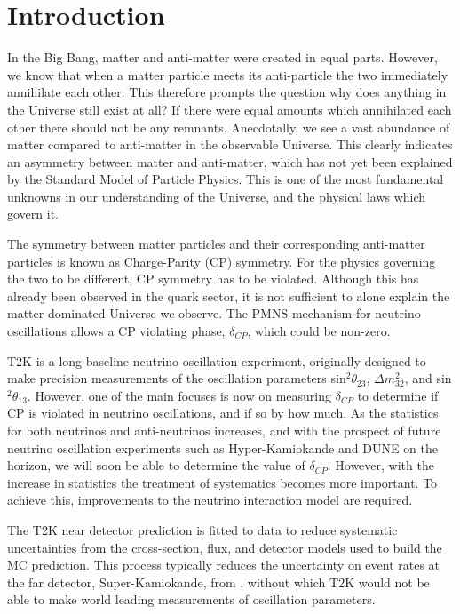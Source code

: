 \chapter{Introduction} \label{sec:introductions}

In the Big Bang, matter and anti-matter were created in equal parts. However, we know that when a matter particle meets its anti-particle the two immediately annihilate each other. This therefore prompts the question why does anything in the Universe still exist at all? If there were equal amounts which annihilated each other there should not be any remnants. Anecdotally, we see a vast abundance of matter compared to anti-matter in the observable Universe. This clearly indicates an asymmetry between matter and anti-matter, which has not yet been explained by the Standard Model of Particle Physics. This is one of the most fundamental unknowns in our understanding of the Universe, and the physical laws which govern it.

The symmetry between matter particles and their corresponding anti-matter particles is known as Charge-Parity (CP) symmetry. For the physics governing the two to be different, CP symmetry has to be violated. Although this has already been observed in the quark sector, it is not sufficient to alone explain the matter dominated Universe we observe. The PMNS mechanism for neutrino oscillations allows a CP violating phase, $\delta_{CP}$, which could be non-zero.

T2K \cite{PhysRevLett.121.171802} is a long baseline neutrino oscillation experiment, originally designed to make precision measurements of the oscillation parameters sin$^2\theta_{23}$, $\Delta m^2_{32}$, and sin$^2\theta_{13}$. However, one of the main focuses is now on measuring $\delta_{CP}$ to determine if CP is violated in neutrino oscillations, and if so by how much. As the statistics for both neutrinos and anti-neutrinos increases, and with the prospect of future neutrino oscillation experiments such as Hyper-Kamiokande \cite{Abe:2018uyc} and DUNE \cite{acciarri2016longbaseline} on the horizon, we will soon be able to determine the value of  $\delta_{CP}$. However, with the increase in statistics the treatment of systematics becomes more important. To achieve this, improvements to the neutrino interaction model are required.

The T2K near detector prediction is fitted to data to reduce systematic uncertainties from the cross-section, flux, and detector models used to build the MC prediction. This process typically reduces the uncertainty on event rates at the far detector, Super-Kamiokande, from , without which T2K would not be able to make world leading measurements of oscillation parameters.

